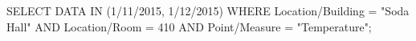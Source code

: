 \begin{sqlcode}
SELECT DATA IN (1/11/2015, 1/12/2015) WHERE
Location/Building = "Soda Hall" AND
Location/Room = 410 AND
Point/Measure = "Temperature";
\end{sqlcode}

